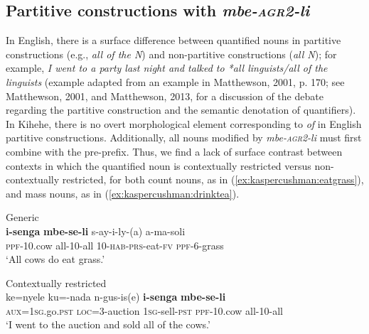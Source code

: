 \documentclass[output=paper,modfonts,nonflat]{langsci/langscibook}
\begin{document}
\subsection{Partitive constructions with \emph{mbe-\textsc{agr2}-li}}

In English, there is a surface difference between quantified nouns in partitive constructions (e.g., \textit{all of the N}) and non-partitive constructions (\textit{all N}); for example, \textit{I went to a party last night and talked to *all linguists/all of the linguists} (example adapted from an example in Matthewson, 2001, p. 170; see Matthewson, 2001, and Matthewson, 2013, for a discussion of the debate regarding the partitive construction and the semantic denotation of quantifiers). In Kihehe, there is no overt morphological element corresponding to \textit{of} in English partitive constructions. Additionally, all nouns modified by \emph{mbe-\textsc{agr2}-li} must first combine with the pre-prefix.  Thus, we find a lack of surface contrast between contexts in which the quantified noun is contextually restricted versus non-contextually restricted, for both count nouns, as in (\ref{ex:kaspercushman:eatgrass}), and mass nouns, as in (\ref{ex:kaspercushman:drinktea}).

\begin{exe} 

\ex \label{ex:kaspercushman:partitive} \begin{xlist} \label{ex:kaspercushman:eatgrass}

\ex Generic\\
\gll \textbf{i-senga} \textbf{mbe-se-li} s-ay-i-ly-(a) a-ma-soli \\
\textsc{ppf}-10.cow all-10-all 10-\textsc{hab}-\textsc{prs}-eat-\textsc{fv} \textsc{ppf}-6-grass \\
\glt `All cows do eat grass.'

\ex  Contextually restricted\\
\gll ke=nyele ku=-nada n-gus-is(e) \textbf{i-senga} \textbf{mbe-se-li} \\
\textsc{aux}=\textsc{1sg}.go.\textsc{pst} \textsc{loc}=3-auction \textsc{1sg}-sell-\textsc{pst} \textsc{ppf}-10.cow all-10-all \\
\glt `I went to the auction and sold all of the cows.'
\end{xlist}
\end{exe}
\end{document}
